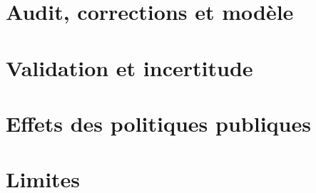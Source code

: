\documentclass[11pt,a4paper,twoside,openany]{book}
\begin{document}
\sloppy
\frontmatter

\tableofcontents

\mainmatter
\part{Audit, corrections et modèle}

\part{Validation et incertitude}


\part{Effets des politiques publiques}



\part{Limites}


\appendix

\backmatter

\end{document}
